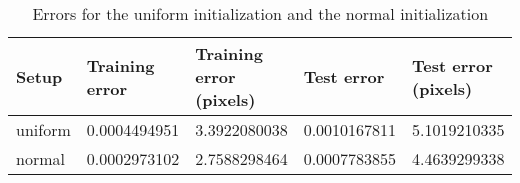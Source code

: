 \begin{table}[h!]
\centering
\footnotesize
\begin{tabular}{|l|l|l|l|l|}
	\hline
		\textbf{Setup} & \textbf{Training error} & \textbf{Training error (pixels)} & \textbf{Test error} & \textbf{Test error (pixels)}\\
	\hline
		uniform	& 0.0004494951%
				& 3.3922080038%
				& 0.0010167811%
				& 5.1019210335%
				\\
	\hline
		normal 	& 0.0002973102%
				& 2.7588298464%
				& 0.0007783855%
				& 4.4639299338%
				\\
	\hline
	\end{tabular}
	\normalsize
	\caption{Errors for the uniform initialization and the normal initialization}
	\label{tab:cnn_errors_uniform}
\end{table}
